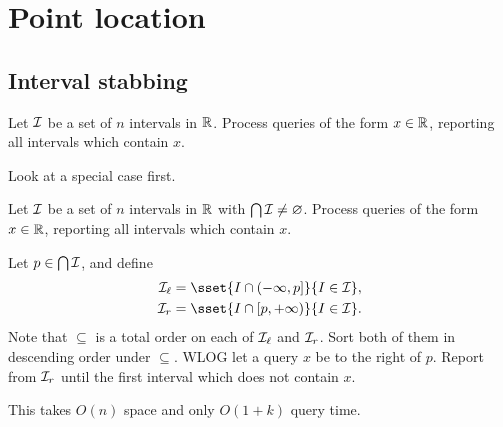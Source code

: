 \chapter{Point location} \label{chp:point-loc}

\section{Interval stabbing} \label{sec:stab-1d}
\begin{question*}
    Let $\mathcal{I}$ be a set of $n$ intervals in $\mathbb{R}$.
    Process queries of the form $x \in \mathbb{R}$, reporting all intervals which
    contain $x$.
\end{question*}

Look at a special case first.
\begin{question*}
    Let $\mathcal{I}$ be a set of $n$ intervals in $\mathbb{R}$ with
    $\bigcap \mathcal{I} \ne \varnothing$.
    Process queries of the form $x \in \mathbb{R}$, reporting all intervals which
    contain $x$.
\end{question*}
\begin{solution}
    Let $p \in \bigcap \mathcal{I}$, and define \begin{align*}
        \mcI_\ell &= \sset{I \cap (-\infty, p]}{I \in \mcI}, \\
        \mcI_r &= \sset{I \cap [p, +\infty)}{I \in \mcI}.
    \end{align*}
    Note that $\subseteq$ is a total order on each of
    $\mathcal{I}_\ell$ and $\mathcal{I}_r$.
    Sort both of them in descending order under $\subseteq$.
    WLOG let a query $x$ be to the right of $p$.
    Report from $\mathcal{I}_r$ until the first interval
    which does not contain $x$.

    This takes $O(n)$ space and only $O(1 + k)$ query time.
\end{solution}

